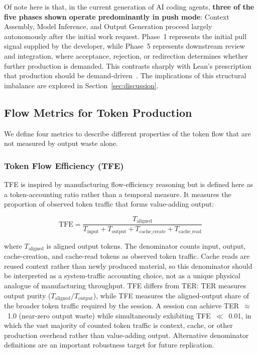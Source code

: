 \documentclass[journal]{IEEEtran}
\begin{document}
Of note here is that, in the current generation of AI coding agents, \textbf{three of the five phases shown operate predominantly in push mode}: Context Assembly, Model Inference, and Output Generation proceed largely autonomously after the initial work request. Phase~1 represents the initial pull signal supplied by the developer, while Phase~5 represents downstream review and integration, where acceptance, rejection, or redirection determines whether further production is demanded. This contrasts sharply with Lean's prescription that production should be demand-driven~\cite{ohno1988, hopp2004}. The implications of this structural imbalance are explored in Section~\ref{sec:discussion}.

\subsection{Flow Metrics for Token Production}

We define four metrics to describe different properties of the token flow that are not measured by output waste alone.

\subsubsection{Token Flow Efficiency (TFE)}

TFE is inspired by manufacturing flow-efficiency reasoning but is defined here as a token-accounting ratio rather than a temporal measure. It measures the proportion of observed token traffic that forms value-adding output:

\begin{equation}
\text{TFE} = \frac{T_{\text{aligned}}}{T_{\text{input}} + T_{\text{output}} + T_{\text{cache\_create}} + T_{\text{cache\_read}}}
\label{eq:tfe}
\end{equation}

\noindent where $T_{\text{aligned}}$ is aligned output tokens. The denominator counts input, output, cache-creation, and cache-read tokens as observed token traffic. Cache reads are reused context rather than newly produced material, so this denominator should be interpreted as a system-traffic accounting choice, not as a unique physical analogue of manufacturing throughput. TFE differs from TER: TER measures output purity ($T_{\text{aligned}} / T_{\text{output}}$), while TFE measures the aligned-output share of the broader token traffic required by the session. A session can achieve TER~$\approx$~1.0 (near-zero output waste) while simultaneously exhibiting TFE~$\ll$~0.01, in which the vast majority of counted token traffic is context, cache, or other production overhead rather than value-adding output. Alternative denominator definitions are an important robustness target for future replication.
\end{document}
